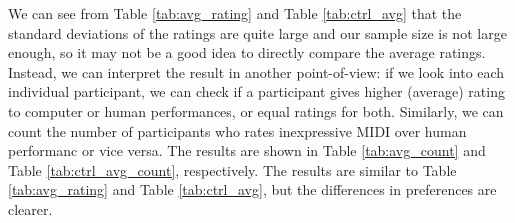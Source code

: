 %

We can see from Table \ref{tab:avg_rating} and Table \ref{tab:ctrl_avg} that the standard deviations of the ratings are quite large and our sample size is not large enough, so it may not be a good idea to directly compare the average ratings. Instead, we can interpret the result in another point-of-view: if we look into each individual participant, we can check if a participant gives higher (average) rating to computer or human performances, or equal ratings for both. Similarly, we can count the number of participants who rates inexpressive MIDI over human performanc or vice versa. The results are shown in Table \ref{tab:avg_count} and Table \ref{tab:ctrl_avg_count}, respectively. The results are similar to Table \ref{tab:avg_rating} and Table \ref{tab:ctrl_avg}, but the differences in preferences are clearer.

